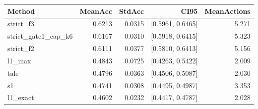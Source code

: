 \begin{tabular}{lrrrr}
\hline
Method & MeanAcc & StdAcc & CI95 & MeanActions \\
\hline
strict_f3 & 0.6213 & 0.0315 & [0.5961, 0.6465] & 5.271 \\
strict_gate1_cap_k6 & 0.6167 & 0.0310 & [0.5918, 0.6415] & 5.323 \\
strict_f2 & 0.6111 & 0.0377 & [0.5810, 0.6413] & 5.156 \\
l1_max & 0.4843 & 0.0725 & [0.4263, 0.5422] & 2.009 \\
tale & 0.4796 & 0.0363 & [0.4506, 0.5087] & 2.030 \\
s1 & 0.4741 & 0.0308 & [0.4495, 0.4987] & 3.353 \\
l1_exact & 0.4602 & 0.0232 & [0.4417, 0.4787] & 2.028 \\
\hline
\end{tabular}
